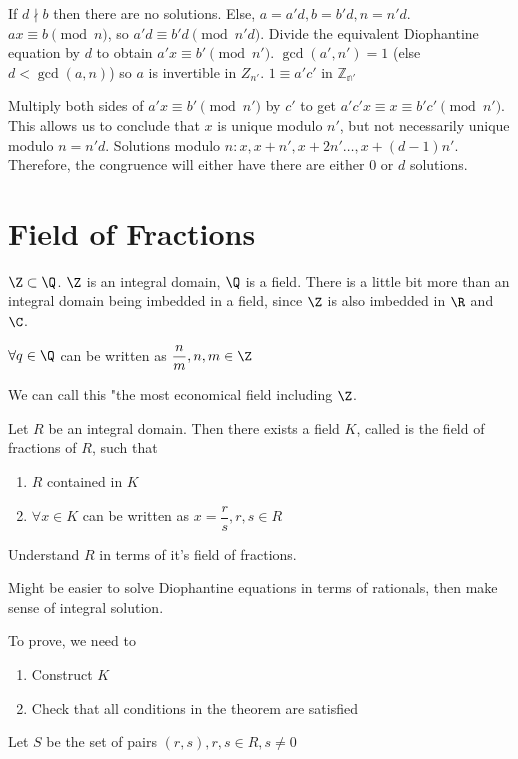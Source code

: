 \documentclass[twoside, 10pt]{article}
\begin{document}
If $d \nmid b$ then there are no solutions. Else, $a = a'd, b = b'd, n = n'd$. $ax \equiv b \pmod{n}$, so $a'd \equiv b'd \pmod{n'd}$. Divide the equivalent Diophantine equation by $d$ to obtain $a'x \equiv b' \pmod{n'}$. $\gcd(a', n') = 1$ (else $d < \gcd(a, n)$) so $a$ is invertible in $Z_{n'}$. $1 \equiv a'c'$ in $\mathbb{Z_{n'}}$


Multiply both sides of $a'x \equiv b' \pmod{n'}$ by $c'$ to get $a'c'x \equiv x \equiv b'c' \pmod{n'}$. This allows us to conclude that $x$ is unique modulo $n'$, but not necessarily unique modulo $n = n'd$. Solutions modulo $n: x, x + n', x + 2n' \ldots, x + (d-1)n'$. Therefore, the congruence will either have there are either 0 or $d$ solutions.

\section{Field of Fractions}
$\Z \subset \Q$. $\Z$ is an integral domain, $\Q$ is a field. There is a little bit more than an integral domain being imbedded in a field, since $\Z$ is also imbedded in $\R$ and $\C$. 

\begin{rmk}
    $\forall q\in \Q$ can be written as $\dfrac{n}{m}, n, m \in \Z$
\end{rmk}
We can call this "the most economical field including $\Z$.

\begin{thm}
    Let $R$ be an integral domain. Then there exists a field $K$, called is the field of fractions of $R$, such that 
    \begin{enumerate}
        \item $R$ contained in $K$
        \item $\forall x\in K$ can be written as $x = \dfrac{r}{s}, r , s\in R$
    \end{enumerate}
\end{thm}
Understand $R$ in terms of it's field of fractions. 

Might be easier to solve Diophantine equations in terms of rationals, then make sense of integral solution.

To prove, we need to 
\begin{enumerate}
    \item Construct $K$ 
    \item Check that all conditions in the theorem are satisfied
\end{enumerate}

Let $S$ be the set of pairs $(r, s), r, s \in R, s\neq 0$
\end{document}
